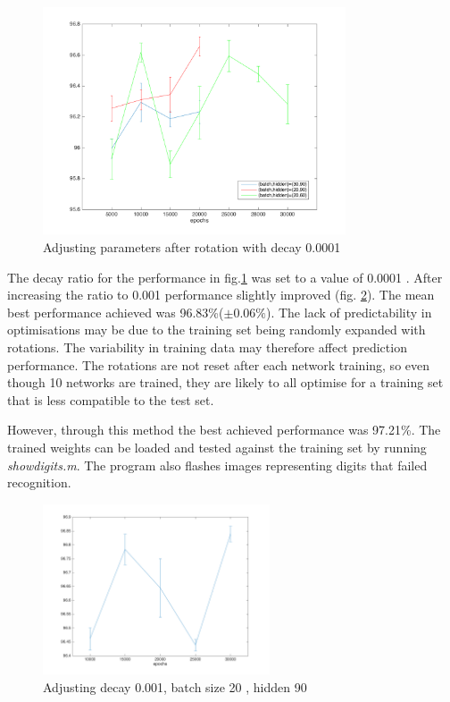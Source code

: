 \documentclass[11]{article}
\begin{document}
\begin{figure}[h]
\centering
\includegraphics[width=0.8\textwidth]{rotations.png}
\caption{Adjusting parameters after rotation with decay 0.0001}
\label{fig:rotations}
\end{figure}

The decay ratio for the performance in fig.\ref{fig:rotations} was set to a value of 0.0001 . After increasing the ratio to 0.001 performance slightly improved (fig. \ref{fig:rotations2}). The mean best performance achieved was 96.83\%($\pm 0.06\%$). The lack of predictability in optimisations may be due to the training set being randomly expanded with rotations. The variability in training data may therefore affect prediction performance. The rotations are not reset after each network training, so even though 10 networks are trained, they are likely to all optimise for a training set that is less compatible to the test set. 

However, through this method the best achieved performance was 97.21\%. The trained weights can be loaded and tested against the training set by running \emph{showdigits.m}. The program also flashes images representing digits that failed recognition. 

\begin{figure}[h]
\centering
\includegraphics[width=0.6\textwidth]{rotations2.png}
\caption{Adjusting decay 0.001, batch size 20 , hidden 90}
\label{fig:rotations2}
\end{figure}
\end{document}
